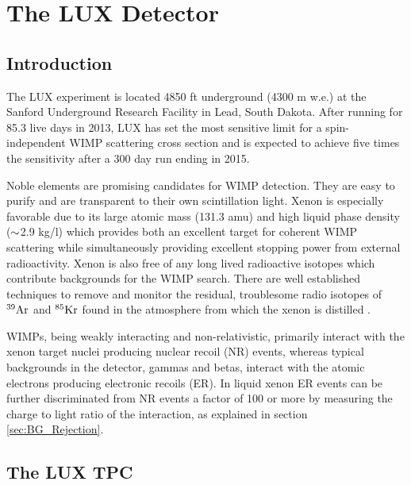 

\renewcommand{\thechapter}{2}

\chapter{The LUX Detector}
\label{Ch:2}

\section{Introduction}

The LUX experiment is located 4850 ft underground (4300 m w.e.) at the Sanford Underground Research Facility in Lead, South Dakota. After running for 85.3 live days in 2013, LUX has set the most sensitive limit for a spin-independent WIMP scattering cross section \cite{LUX_PRL} and is expected to achieve five times the sensitivity after a 300 day run ending in 2015. 

Noble elements are promising candidates for WIMP detection. They are easy to purify and are transparent to their own scintillation light. Xenon is especially favorable due to its  large atomic mass (131.3 amu) and high liquid phase density ($\rm \sim$2.9 kg/l) which provides both an excellent target for coherent WIMP scattering while simultaneously providing excellent stopping power from external radioactivity. Xenon is also free of any long lived radioactive isotopes which contribute backgrounds for the WIMP search. There are well established techniques to remove and monitor the residual, troublesome radio isotopes of $\rm ^{39}Ar$ and $\rm^{85}Kr$ found in the atmosphere from which the xenon is distilled \cite{Aprile_LXe_overview} \cite{Kr_ppt_Dobi} \cite{lux_kr_removal} \cite{xmass_kr_removal}.
 
WIMPs, being weakly interacting and non-relativistic, primarily interact with the xenon target nuclei producing nuclear recoil (NR) events, whereas typical backgrounds in the detector, gammas and betas, interact with the atomic electrons producing electronic recoils (ER). In liquid xenon ER events can be further discriminated from NR events a factor of 100 or more by measuring the charge to light ratio of the interaction, as explained in section \ref{sec:BG_Rejection}.


\section{The LUX TPC}

